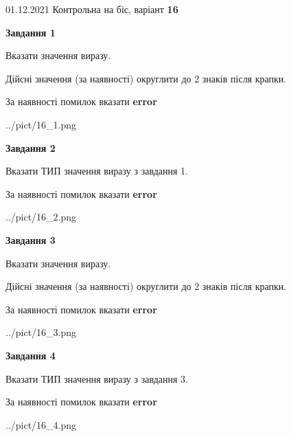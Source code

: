 \documentclass[11pt, ukrainian]{article}
\begin{document}
{01.12.2021 Контрольна на біс, варіант  \No \textbf { 16 }\par}
{
\begin {large}
{\begin {center}\textbf{Завдання 1}\end {center}}\par
Вказати значення виразу. \par
Дійсні значення (за наявності) округлити до 2 знаків після крапки. \par
За наявності помилок вказати \textbf{error}

\begin{center}
	{../pict/16_1.png}
\end{center}
\newpage

{\begin {center}\textbf{Завдання 2}\end {center}}\par
Вказати ТИП значення виразу з завдання 1. \par
За наявності помилок вказати \textbf{error}

\begin{center}
	{../pict/16_2.png}
\end{center}
\newpage

{\begin {center}\textbf{Завдання 3}\end {center}}\par
Вказати значення виразу. \par
Дійсні значення (за наявності) округлити до 2 знаків після крапки. \par
За наявності помилок вказати \textbf{error}

\begin{center}
	{../pict/16_3.png}
\end{center}
\newpage

{\begin {center}\textbf{Завдання 4}\end {center}}\par
Вказати ТИП значення виразу з завдання 3. \par
За наявності помилок вказати \textbf{error}

\begin{center}
	{../pict/16_4.png}
\end{center}
\newpage


\end{large}}
\end{document}

